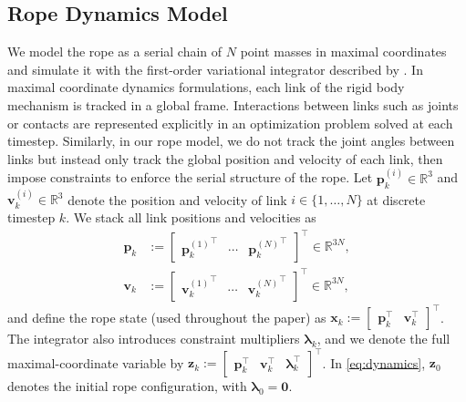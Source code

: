 \documentclass[conference]{IEEEtran}
\newcommand{\state}{\mathbf{x}}
\begin{document}
\subsection{Rope Dynamics Model}
\label{sec:dynamics_model}
We model the rope as a serial chain of $N$ point masses in maximal coordinates and simulate it with the first-order variational integrator described by \citet{lavalle_linear-time_2021}. In maximal coordinate dynamics formulations, each link of the rigid body mechanism is tracked in a global frame. Interactions between links such as joints or contacts are represented explicitly in an optimization problem solved at each timestep. Similarly, in our rope model, we do not track the joint angles between links but instead only track the global position and velocity of each link, then impose constraints to enforce the serial structure of the rope. Let $\mathbf{p}_k^{(i)}\in\mathbb{R}^3$ and $\mathbf{v}_k^{(i)}\in\mathbb{R}^3$ denote the position and velocity of link $i\in\{1,\dots,N\}$ at discrete timestep $k$. We stack all link positions and velocities as
\begin{align*}
    \mathbf{p}_k &:= \begin{bmatrix} {\mathbf{p}_k^{(1)}}^\top & \cdots & {\mathbf{p}_k^{(N)}}^\top \end{bmatrix}^\top \in \mathbb{R}^{3N}, \\
    \mathbf{v}_k &:= \begin{bmatrix} {\mathbf{v}_k^{(1)}}^\top & \cdots & {\mathbf{v}_k^{(N)}}^\top \end{bmatrix}^\top \in \mathbb{R}^{3N},
\end{align*}
and define the rope state (used throughout the paper) as $\state_k := \begin{bmatrix}\mathbf{p}_k^\top & \mathbf{v}_k^\top\end{bmatrix}^\top$. The integrator also introduces constraint multipliers $\boldsymbol{\lambda}_k$, and we denote the full maximal-coordinate variable by $\mathbf{z}_k := \begin{bmatrix}\mathbf{p}_k^\top & \mathbf{v}_k^\top & \boldsymbol{\lambda}_k^\top\end{bmatrix}^\top$. In \cref{eq:dynamics}, $\mathbf{z}_0$ denotes the initial rope configuration, with $\boldsymbol{\lambda}_0=\mathbf{0}$.
\end{document}
